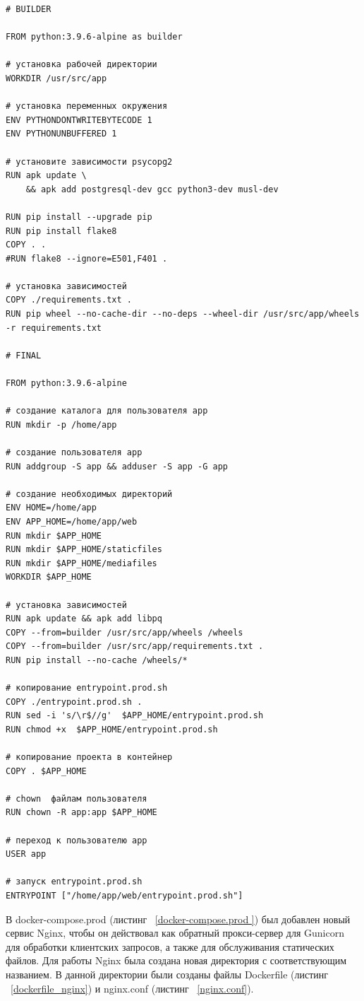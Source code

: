 \begin{lstlisting}[frame=single, label={dockerfile.prod}, caption={Dockerfile.prod}, language={docker}] 
# BUILDER

FROM python:3.9.6-alpine as builder

# установка рабочей директории
WORKDIR /usr/src/app

# установка переменных окружения
ENV PYTHONDONTWRITEBYTECODE 1
ENV PYTHONUNBUFFERED 1

# установите зависимости psycopg2
RUN apk update \
    && apk add postgresql-dev gcc python3-dev musl-dev

RUN pip install --upgrade pip
RUN pip install flake8
COPY . .
#RUN flake8 --ignore=E501,F401 .

# установка зависимостей
COPY ./requirements.txt .
RUN pip wheel --no-cache-dir --no-deps --wheel-dir /usr/src/app/wheels -r requirements.txt

# FINAL

FROM python:3.9.6-alpine

# создание каталога для пользователя app
RUN mkdir -p /home/app

# создание пользователя app
RUN addgroup -S app && adduser -S app -G app

# создание необходимых директорий
ENV HOME=/home/app
ENV APP_HOME=/home/app/web
RUN mkdir $APP_HOME
RUN mkdir $APP_HOME/staticfiles
RUN mkdir $APP_HOME/mediafiles
WORKDIR $APP_HOME

# установка зависимостей
RUN apk update && apk add libpq
COPY --from=builder /usr/src/app/wheels /wheels
COPY --from=builder /usr/src/app/requirements.txt .
RUN pip install --no-cache /wheels/*

# копирование entrypoint.prod.sh
COPY ./entrypoint.prod.sh .
RUN sed -i 's/\r$//g'  $APP_HOME/entrypoint.prod.sh
RUN chmod +x  $APP_HOME/entrypoint.prod.sh

# копирование проекта в контейнер
COPY . $APP_HOME

# chown  файлам пользователя
RUN chown -R app:app $APP_HOME

# переход к пользователю app
USER app

# запуск entrypoint.prod.sh
ENTRYPOINT ["/home/app/web/entrypoint.prod.sh"]
\end{lstlisting}
	В \textsf{docker-compose.prod} (листинг ~\ref{docker-compose.prod }) был добавлен новый сервис \textsf{Nginx}, чтобы он действовал как обратный прокси-сервер для \textsf{Gunicorn} для обработки клиентских запросов, а также для обслуживания статических файлов. Для работы \textsf{Nginx} была создана новая директория с соответствующим названием. В данной директории были созданы файлы \textsf{Dockerfile} (листинг ~\ref{dockerfile_nginx}) и \textsf{nginx.conf} (листинг  ~\ref{nginx.conf}).

